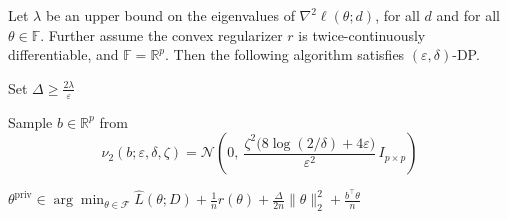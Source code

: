 Let $\lambda$ be an upper bound on the eigenvalues of $\nabla^2\ell(\theta;d)$, for all $d$ and for all $\theta\in\mathbb{F}$. Further assume the convex regularizer $r$ is twice-continuously differentiable, and $\mathbb{F}=\mathbb{R}^p$. Then the following algorithm satisfies $(\varepsilon,\delta)$-DP.
\begin{algorithm}[t]
\caption{Generalized Objective Perturbation Mechanism (Obj-Pert)}

Set $\Delta \ge \frac{2\lambda}{\varepsilon}$\;

Sample $b\in\mathbb{R}^p$ from
\[
\nu_2(b;\varepsilon,\delta,\zeta)
=\mathcal{N}\!\left(0,\ \frac{\zeta^2\bigl(8\log(2/\delta)+4\varepsilon\bigr)}{\varepsilon^2}\,I_{p\times p}\right)
\]

\Return $\displaystyle
\theta^{\mathrm{priv}}
\in \arg\min_{\theta\in\mathcal{F}}
\widehat{L}(\theta;D)+\frac{1}{n}r(\theta)+\frac{\Delta}{2n}\|\theta\|_2^2+\frac{b^\top \theta}{n}
$\;
\end{algorithm}